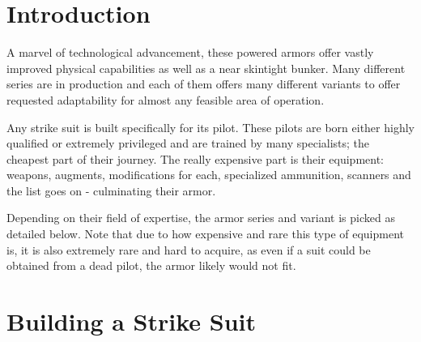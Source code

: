 \documentclass[12pt,a4paper,openany]{book}
\begin{document}
	

	\chapter{Introduction}
	A marvel of technological advancement, these powered armors offer vastly improved physical capabilities as well as a near skintight bunker. Many different series are in production and each of them offers many different variants to offer requested adaptability for almost any feasible area of operation.\par
	Any strike suit is built specifically for its pilot. These pilots are born either highly qualified or extremely privileged and are trained by many specialists; the cheapest part of their journey. The really expensive part is their equipment: weapons, augments, modifications for each, specialized ammunition, scanners and the list goes on - culminating their armor.\par
	Depending on their field of expertise, the armor series and variant is picked as detailed below. Note that due to how expensive and rare this type of equipment is, it is also extremely rare and hard to acquire, as even if a suit could be obtained from a dead pilot, the armor likely would not fit.

	\chapter{Building a Strike Suit}
\end{document}
